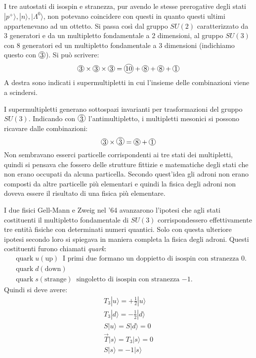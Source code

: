 I tre autostati di isospin e stranezza, pur avendo le stesse prerogative degli 
stati
$|p^+\rangle,|n\rangle,|\Lambda^0\rangle$, non potevano coincidere con questi in
quanto questi ultimi appartenevano
ad un ottetto.
Si passa così dal gruppo $SU(2)$ caratterizzato da 3 generatori e da un
multipletto fondamentale a 2 dimensioni, al
gruppo $SU(3)$ con 8 generatori ed un multipletto fondamentale a 3 dimensioni
(indichiamo questo con $\Ci{3}$). Si può scrivere:
\begin{equation}
\Ci{3}\times\Ci{3}\times\Ci{3}=\Ci{10}+\Ci{8}+\Ci{8}+\Ci{1}
\end{equation}
A destra sono indicati i supermultipletti in cui l'insieme delle combinazioni
viene a scindersi.

I supermultipletti generano sottospazi invarianti per trasformazioni del gruppo
$SU(3)$. Indicando con $\Ci{$\bar{3}$}$ l'antimultipletto, i multipletti 
mesonici
si possono ricavare dalle combinazioni:
\[
\Ci{3}\times\Ci{$\bar{3}$}=\Ci{8}+\Ci{1}
\]
Non sembravano esserci particelle corrispondenti ai tre stati dei multipletti,
quindi si pensava che fossero delle strutture fittizie e matematiche degli stati
che non erano occupati da alcuna particella.
Secondo quest'idea gli adroni non erano composti da altre particelle più
elementari e quindi la fisica degli adroni non doveva essere il risultato di una
fisica più elementare.

I due fisici Gell-Mann e Zweig nel '64 avanzarono l'ipotesi che agli stati 
costituenti il multipletto fondamentale
di $SU(3)$ corrispondessero effettivamente tre entità fisiche con determinati 
numeri quantici.
Solo con questa ulteriore ipotesi secondo loro si spiegava in maniera completa 
la fisica degli adroni. Questi
costituenti furono chiamati \textit{quark}:
\begin{equation}
\begin{split}
&\text{quark}\;u (\text{up})\;\;\text{I primi due formano un doppietto di 
isospin con stranezza $0$.}\\
&\text{quark}\;d (\text{down})\\
&\text{quark}\;s (\text{strange})\;\;\text{singoletto di isospin con stranezza 
$-1$.}
\end{split}
\end{equation}
Quindi si deve avere:
\begin{gather}
T_3|u\rangle=+\frac{1}{2}|u\rangle\\
T_3|d\rangle=-\frac{1}{2}|d\rangle\\
S|u\rangle=S|d\rangle=0\\
\vec{T}|s\rangle=T_3|s\rangle=0\\
S|s\rangle=-1|s\rangle
\end{gather}

